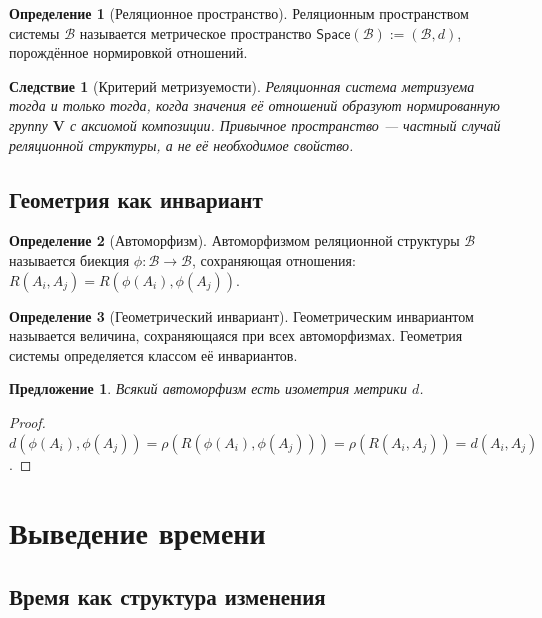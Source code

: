 \documentclass[12pt,a4paper,oneside]{book}
\theoremstyle{definition}
\newtheorem{definition}{Определение}[chapter]
\theoremstyle{plain}
\newtheorem{corollary}{Следствие}[chapter]
\newtheorem{proposition}{Предложение}[chapter]
\theoremstyle{remark}
\newcommand{\SubParts}{\mathcal B}
\newcommand{\Rel}{R}
\newcommand{\Vstruct}{\mathbf V}
\newcommand{\norm}{\rho}
\newcommand{\Space}{\mathsf{Space}}
\begin{document}
\begin{definition}[Реляционное пространство]
Реляционным пространством системы $\SubParts$ называется метрическое пространство
$\Space(\SubParts):=(\SubParts,d)$, порождённое нормировкой отношений.
\end{definition}

\begin{corollary}[Критерий метризуемости]
Реляционная система метризуема тогда и только тогда, когда значения её отношений
образуют нормированную группу $\Vstruct$ с аксиомой композиции. Привычное
пространство --- частный случай реляционной структуры, а не её необходимое свойство.
\end{corollary}

\section{Геометрия как инвариант}

\begin{definition}[Автоморфизм]
Автоморфизмом реляционной структуры $\SubParts$ называется биекция
$\phi:\SubParts\to\SubParts$, сохраняющая отношения:
$\Rel(A_i,A_j)=\Rel(\phi(A_i),\phi(A_j))$.
\end{definition}

\begin{definition}[Геометрический инвариант]
Геометрическим инвариантом называется величина, сохраняющаяся при всех автоморфизмах.
Геометрия системы определяется классом её инвариантов.
\end{definition}

\begin{proposition}
Всякий автоморфизм есть изометрия метрики $d$.
\end{proposition}

\begin{proof}
$d(\phi(A_i),\phi(A_j))=\norm(\Rel(\phi(A_i),\phi(A_j)))=\norm(\Rel(A_i,A_j))=d(A_i,A_j)$.
\end{proof}

\chapter{Выведение времени}

\section{Время как структура изменения}
\end{document}
